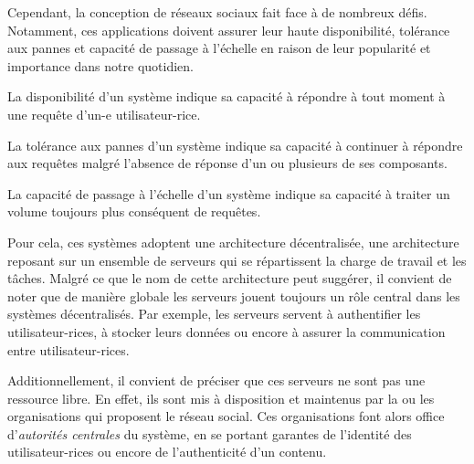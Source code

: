 Cependant, la conception de réseaux sociaux fait face à de nombreux défis.
Notamment, ces applications doivent assurer leur haute disponibilité, tolérance aux pannes et capacité de passage à l'échelle en raison de leur popularité et importance dans notre quotidien.
\begin{definition}[Disponibilité]
  \label{def:availability}
  La disponibilité d'un système indique sa capacité à répondre à tout moment à une requête d'un-e utilisateur-rice.
\end{definition}
\begin{definition}
  La tolérance aux pannes d'un système indique sa capacité à continuer à répondre aux requêtes malgré l'absence de réponse d'un ou plusieurs de ses composants.
\end{definition}
\begin{definition}
  La capacité de passage à l'échelle d'un système indique sa capacité à traiter un volume toujours plus conséquent de requêtes.
\end{definition}
Pour cela, ces systèmes adoptent une architecture décentralisée\footnotemark, \ie une architecture reposant sur un ensemble de serveurs qui se répartissent la charge de travail et les tâches.
Malgré ce que le nom de cette architecture peut suggérer, il convient de noter que de manière globale les serveurs jouent toujours un rôle central dans les systèmes décentralisés.
Par exemple, les serveurs servent à authentifier les utilisateur-rices, à stocker leurs données ou encore à assurer la communication entre utilisateur-rices.

Additionnellement, il convient de préciser que ces serveurs ne sont pas une ressource libre.
En effet, ils sont mis à disposition et maintenus par la ou les organisations qui proposent le réseau social.
Ces organisations font alors office d'\emph{autorités centrales} du système, \eg en se portant garantes de l'identité des utilisateur-rices ou encore de l'authenticité d'un contenu.

